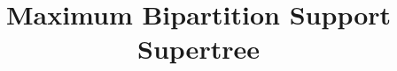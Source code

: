 \documentclass{bmcart}
\begin{document}
\begin{frontmatter}

\begin{fmbox}


\title{Maximum Bipartition Support Supertree}


\author[
   addressref={aff1},                   %
   email={yuxilin51@gmail.com}   %
]{ }
\author[
   addressref={aff1},
   email={thienle2@illinois.edu}
]{ }

\author[
   addressref={aff1},
   email={sac@illinois.edu}
]{ }

\author[
   addressref={aff1},
   email={emolloy2@illinois.edu}
]{ }

\author[
   addressref={aff1},
   email={warnow@illinois.edu}
]{ }


\address[id=aff1]{%
  , %
  ,                     %
  ,                              %
}


\end{fmbox}
\end{frontmatter}
\end{document}
